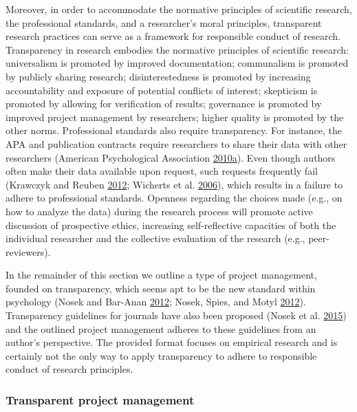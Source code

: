 \documentclass[a5paper]{book}
\begin{document}
Moreover, in order to accommodate the normative principles of scientific
research, the professional standards, and a researcher's moral
principles, transparent research practices can serve as a framework for
responsible conduct of research. Transparency in research embodies the
normative principles of scientific research: universalism is promoted by
improved documentation; communalism is promoted by publicly sharing
research; disinterestedness is promoted by increasing accountability and
exposure of potential conflicts of interest; skepticism is promoted by
allowing for verification of results; governance is promoted by improved
project management by researchers; higher quality is promoted by the
other norms. Professional standards also require transparency. For
instance, the APA and publication contracts require researchers to share
their data with other researchers (American Psychological Association
\protect\hyperlink{ref-apa2010}{2010}\protect\hyperlink{ref-apa2010}{a}).
Even though authors often make their data available upon request, such
requests frequently fail (Krawczyk and Reuben
\protect\hyperlink{ref-doi:10.1080ux2f08989621.2012.678688}{2012};
Wicherts et al.
\protect\hyperlink{ref-doi:10.1037ux2f0003-066x.61.7.726}{2006}), which
results in a failure to adhere to professional standards. Openness
regarding the choices made (e.g., on how to analyze the data) during the
research process will promote active discussion of prospective ethics,
increasing self-reflective capacities of both the individual researcher
and the collective evaluation of the research (e.g., peer-reviewers).

In the remainder of this section we outline a type of project
management, founded on transparency, which seems apt to be the new
standard within psychology (Nosek and Bar-Anan
\protect\hyperlink{ref-doi:10.1080ux2f1047840X.2012.692215}{2012};
Nosek, Spies, and Motyl
\protect\hyperlink{ref-doi:10.1177ux2f1745691612459058}{2012}).
Transparency guidelines for journals have also been proposed (Nosek et
al. \protect\hyperlink{ref-doi:10.1126ux2fscience.aab2374}{2015}) and
the outlined project management adheres to these guidelines from an
author's perspective. The provided format focuses on empirical research
and is certainly not the only way to apply transparency to adhere to
responsible conduct of research principles.

\subsubsection{Transparent project
management}\label{transparent-project-management}
\end{document}
